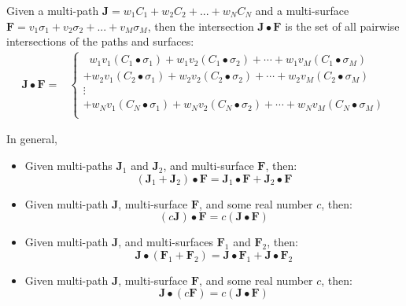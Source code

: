 Given a multi-path \(\mathbf{J} = w_1C_1 + w_2C_2 + ... + w_NC_N\) and a multi-surface \\ \(\mathbf{F} = v_1\sigma_1 + v_2\sigma_2 + ... + v_M\sigma_M\), then the intersection \(\mathbf{J} \bullet \mathbf{F}\) is the set of all pairwise intersections of the paths and surfaces:
\begin{align*}
\mathbf{J} \bullet \mathbf{F} = & \left\{\begin{array}{c}
\;\; w_1 v_1 (C_1 \bullet \sigma_1) + w_1 v_2 (C_1 \bullet \sigma_2) + \cdots + w_1 v_M (C_1 \bullet \sigma_M) \\ 
+ w_2 v_1 (C_2 \bullet \sigma_1) + w_2 v_2 (C_2 \bullet \sigma_2) + \cdots + w_2 v_M (C_2 \bullet \sigma_M) \\ 
\vdots \\
+ w_N v_1 (C_N \bullet \sigma_1) + w_N v_2 (C_N \bullet \sigma_2) + \cdots + w_N v_M (C_N \bullet \sigma_M) \\ 
\end{array}\right.
\end{align*}

In general,
\begin{itemize}
\item Given multi-paths \(\mathbf{J}_1\) and \(\mathbf{J}_2\), and multi-surface \(\mathbf{F}\), then:
\[(\mathbf{J}_1 + \mathbf{J}_2) \bullet \mathbf{F} = \mathbf{J}_1 \bullet \mathbf{F} + \mathbf{J}_2 \bullet \mathbf{F}\] 
\item Given multi-path \(\mathbf{J}\), multi-surface \(\mathbf{F}\), and some real number \(c\), then:
\[(c\mathbf{J}) \bullet \mathbf{F} = c(\mathbf{J} \bullet \mathbf{F})\]
\item Given multi-path \(\mathbf{J}\), and multi-surfaces \(\mathbf{F}_1\) and \(\mathbf{F}_2\), then:
\[\mathbf{J} \bullet (\mathbf{F}_1 + \mathbf{F}_2) = \mathbf{J} \bullet \mathbf{F}_1 + \mathbf{J} \bullet \mathbf{F}_2\] 
\item Given multi-path \(\mathbf{J}\), multi-surface \(\mathbf{F}\), and some real number \(c\), then:
\[\mathbf{J} \bullet (c\mathbf{F}) = c(\mathbf{J} \bullet \mathbf{F})\]
\end{itemize}

